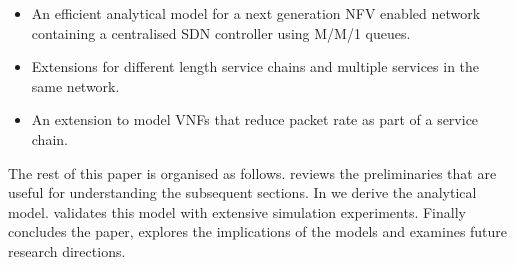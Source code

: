 \begin{itemize}
\item An efficient analytical model for a next generation NFV enabled network containing a centralised SDN controller using M/M/1 queues.
\item Extensions for different length service chains and multiple services in the same network.
\item An extension to model VNFs that reduce packet rate as part of a service chain.
\end{itemize}

The rest of this paper is organised as follows.  reviews the preliminaries that are useful for understanding the subsequent sections. In  we derive the analytical model.  validates this model with extensive simulation experiments. Finally  concludes the paper, explores the implications of the models and examines future research directions.